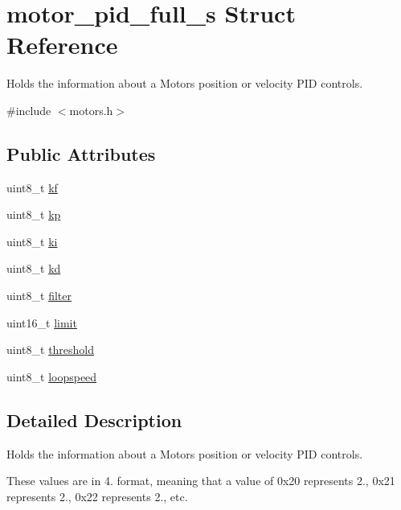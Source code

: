 \hypertarget{structmotor__pid__full__s}{}\section{motor\+\_\+pid\+\_\+full\+\_\+s Struct Reference}
\label{structmotor__pid__full__s}


Holds the information about a Motor\textquotesingle{}s position or velocity P\+ID controls.  




{\ttfamily \#include $<$motors.\+h$>$}

\subsection*{Public Attributes}
\begin{DoxyCompactItemize}
\item 
uint8\+\_\+t \hyperlink{structmotor__pid__full__s_aca37978c9743342bf520dcadf2eed67c}{kf}
\item 
uint8\+\_\+t \hyperlink{structmotor__pid__full__s_a5c90af94c336d26a8ecdd4b88f06c9d9}{kp}
\item 
uint8\+\_\+t \hyperlink{structmotor__pid__full__s_ad6800234728012e59dc6c945cc6465d5}{ki}
\item 
uint8\+\_\+t \hyperlink{structmotor__pid__full__s_a02e542bcec0f870af870cd37a4e2a922}{kd}
\item 
uint8\+\_\+t \hyperlink{structmotor__pid__full__s_af6f15fc8e1a49098f69aba255a3b21c6}{filter}
\item 
uint16\+\_\+t \hyperlink{structmotor__pid__full__s_a98141ce9bce70a500cf18c7a92d866c5}{limit}
\item 
uint8\+\_\+t \hyperlink{structmotor__pid__full__s_a50b463b6ffd906bfef9ae1edc7cc872e}{threshold}
\item 
uint8\+\_\+t \hyperlink{structmotor__pid__full__s_a567385b82081690c526a618b2110e030}{loopspeed}
\end{DoxyCompactItemize}


\subsection{Detailed Description}
Holds the information about a Motor\textquotesingle{}s position or velocity P\+ID controls. 

These values are in 4. format, meaning that a value of 0x20 represents 2., 0x21 represents 2., 0x22 represents 2., etc. 

